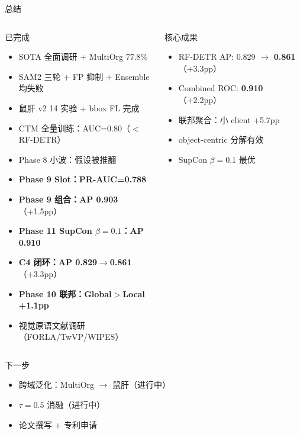 \documentclass[aspectratio=169, 10pt]{beamer}
\begin{document}
\begin{frame}{总结}
  \begin{columns}[T]
    \begin{block}{已完成}
      \begin{itemize}
        \item[\checkmark] SOTA 全面调研 + MultiOrg 77.8\%
        \item[\checkmark] SAM2 三轮 + FP 抑制 + Ensemble 均失败
        \item[\checkmark] 鼠肝 v2 14 实验 + bbox FL 完成
        \item[\checkmark] CTM 全量训练：AUC=0.80（$<$RF-DETR）
        \item[\checkmark] Phase 8 小波：假设被推翻
        \item[\checkmark] \textbf{Phase 9 Slot：PR-AUC=0.788}
        \item[\checkmark] \textbf{Phase 9 组合：AP 0.903}（+1.5pp）
        \item[\checkmark] \textbf{Phase 11 SupCon $\beta=0.1$：AP 0.910}
        \item[\checkmark] \textbf{C4 闭环：AP 0.829$\to$0.861}（+3.3pp）
        \item[\checkmark] \textbf{Phase 10 联邦：Global$>$Local +1.1pp}
        \item[\checkmark] 视觉原语文献调研（FORLA/TwVP/WIPES）
      \end{itemize}
    \end{block}
    \begin{alertblock}{核心成果}
      \begin{itemize}
        \item RF-DETR AP: 0.829 $\to$ \textbf{0.861}（+3.3pp）
        \item Combined ROC: \textbf{0.910}（+2.2pp）
        \item 联邦聚合：小 client +5.7pp
        \item object-centric 分解有效
        \item SupCon $\beta=0.1$ 最优
      \end{itemize}
    \end{alertblock}
  \end{columns}
  \vspace{0em}
  \begin{alertblock}{下一步}
    \begin{itemize}
      \item 跨域泛化：MultiOrg $\to$ 鼠肝（进行中）
      \item $\tau=0.5$ 消融（进行中）
      \item 论文撰写 + 专利申请
    \end{itemize}
  \end{alertblock}
\end{frame}
\end{document}
